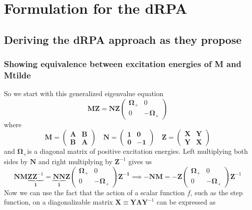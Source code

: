 \section{Formulation for the dRPA}
\subsection{Deriving the dRPA approach as they propose}
\subsubsection{Showing equivalence between excitation energies of M and Mtilde}
So we start with this generalized eigenvalue equation
$$
\mathbf{M}\bm{Z}=\mathbf{N}\bm{Z}\left(\begin{array}{cc}
\boldsymbol{\Omega}_{+} & 0 \\
0 & -\boldsymbol{\Omega}_{+}
\end{array}\right)
$$
where
$$
\mathbf{M} =\left(\begin{array}{ll}
\mathbf{A} & \mathbf{B} \\
\mathbf{B} & \mathbf{A}
\end{array}\right) \quad 
\mathbf{N} =\left(\begin{array}{cc}
\mathbf{1} & \mathbf{0} \\
\mathbf{0} & -\mathbf{1}
\end{array}\right) \quad
\bm{Z} =\left(\begin{array}{ll}
\bm{X} & \bm{Y} \\
\bm{Y} & \bm{X}
\end{array}\right)
$$
and $\boldsymbol{\Omega}_{+}$is a diagonal matrix of positive excitation energies. Left multiplying both sides by $\bm{N}$ and right multiplying by $\bm{Z}^{-1}$ gives us
\begin{equation}
    \bm{N}\bm{M}\underbrace{\bm{Z} \bm{Z}^{-1}}_{\bm{1}} = \underbrace{\bm{N}\bm{N}}_{\bm{1}}\bm{Z}\left(\begin{array}{cc}
\boldsymbol{\Omega}_{+} & 0 \\
0 & -\boldsymbol{\Omega}_{+}
\end{array}\right) \bm{Z^{-1}} \implies - \bm{N}\bm{M} = -\bm{Z}\left(\begin{array}{cc}\boldsymbol{\Omega}_{+} & 0 \\
0 & -\boldsymbol{\Omega}_{+}
\end{array}\right)\bm{Z}^{-1}
\end{equation}
Now we can use the fact that the action of a scalar function $f$, such as the step function, on a diagonalizable matrix $\bm{X} \equiv \bm{Y} \bm{\Lambda} \bm{Y}^{-1}$ can be expressed as
